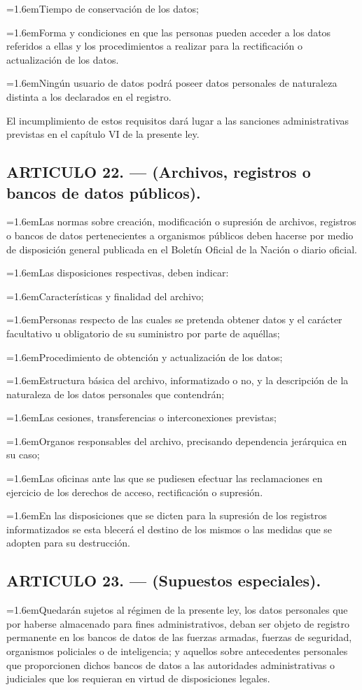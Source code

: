 \documentclass[10pt,a4paper]{article}
\newcommand{\articulo}[1]{\subsection{#1}}
\newcommand{\inciso}[2]{\par{\hangindent=1.6em\hangafter=1\makebox[1.6em][l]{#1}#2\par}}
\begin{document}
\inciso{h)}{Tiempo de conservación de los datos;}

\inciso{i)}{Forma y condiciones en que las personas pueden acceder a los datos referidos a ellas y los procedimientos a realizar para la rectificación o actualización de los datos.}

\inciso{3)}{Ningún usuario de datos podrá poseer datos personales de naturaleza distinta a los declarados en el registro.}

El incumplimiento de estos requisitos dará lugar a las sanciones administrativas previstas en el capítulo VI de la presente ley.

\articulo{ARTICULO 22. — (Archivos, registros o bancos de datos públicos).}
\inciso{1.}{Las normas sobre creación, modificación o supresión de archivos, registros o bancos de datos pertenecientes a organismos públicos deben hacerse por medio de disposición general publicada en el Boletín Oficial de la Nación o diario oficial.}

\inciso{2.}{Las disposiciones respectivas, deben indicar:}

\inciso{a)}{Características y finalidad del archivo;}

\inciso{b)}{Personas respecto de las cuales se pretenda obtener datos y el carácter facultativo u obligatorio de su suministro por parte de aquéllas;}

\inciso{c)}{Procedimiento de obtención y actualización de los datos;}

\inciso{d)}{Estructura básica del archivo, informatizado o no, y la descripción de la naturaleza de los datos personales que contendrán;}

\inciso{e)}{Las cesiones, transferencias o interconexiones previstas;}

\inciso{f)}{Organos responsables del archivo, precisando dependencia jerárquica en su caso;}

\inciso{g)}{Las oficinas ante las que se pudiesen efectuar las reclamaciones en ejercicio de los derechos de acceso, rectificación o supresión.}

\inciso{3.}{En las disposiciones que se dicten para la supresión de los registros informatizados se esta blecerá el destino de los mismos o las medidas que se adopten para su destrucción.}

\articulo{ARTICULO 23. — (Supuestos especiales).}
\inciso{1.}{Quedarán sujetos al régimen de la presente ley, los datos personales que por haberse almacenado para fines administrativos, deban ser objeto de registro permanente en los bancos de datos de las fuerzas armadas, fuerzas de seguridad, organismos policiales o de inteligencia; y aquellos sobre antecedentes personales que proporcionen dichos bancos de datos a las autoridades administrativas o judiciales que los requieran en virtud de disposiciones legales.}
\end{document}
